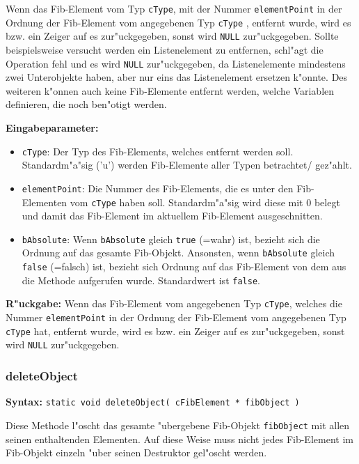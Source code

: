 Wenn das Fib-Element vom Typ \verb|cType|, mit der Nummer \verb|elementPoint| in der Ordnung der Fib-Element vom angegebenen Typ \verb|cType| , entfernt wurde, wird es bzw. ein Zeiger auf es zur"uckgegeben, sonst wird \verb|NULL| zur"uckgegeben. Sollte beispielsweise versucht werden ein Listenelement zu entfernen, schl"agt die Operation fehl und es wird \verb|NULL| zur"uckgegeben, da Listenelemente mindestens zwei Unterobjekte haben, aber nur eins das Listenelement ersetzen k"onnte. Des weiteren k"onnen auch keine Fib-Elemente entfernt werden, welche Variablen definieren, die noch ben"otigt werden.

\bigskip\noindent
\textbf{Eingabeparameter:}
\begin{itemize}
 \item \verb|cType|: Der Typ des Fib-Elements, welches entfernt werden soll. Standardm"a"sig ('u') werden Fib-Elemente aller Typen betrachtet/ gez"ahlt.
 \item \verb|elementPoint|: Die Nummer des Fib-Elements, die es unter den Fib-Elementen vom \verb|cType| haben soll. Standardm"a"sig wird diese mit $0$ belegt und damit das Fib-Element im aktuellem Fib-Element ausgeschnitten.
 \item \verb|bAbsolute|: Wenn \verb|bAbsolute| gleich \verb|true| (=wahr) ist, bezieht sich die Ordnung auf das gesamte Fib-Objekt. Ansonsten, wenn \verb|bAbsolute| gleich \verb|false| (=falsch) ist, bezieht sich Ordnung auf das Fib-Element von dem aus die Methode aufgerufen wurde. Standardwert ist \verb|false|.
\end{itemize}

\bigskip\noindent
\textbf{R"uckgabe:} Wenn das Fib-Element vom angegebenen Typ \verb|cType|, welches die Nummer \verb|elementPoint| in der Ordnung der Fib-Element vom angegebenen Typ \verb|cType| hat, entfernt wurde, wird es bzw. ein Zeiger auf es zur"uckgegeben, sonst wird \verb|NULL| zur"uckgegeben.


\subsubsection{deleteObject}

\textbf{Syntax:} \verb|static void deleteObject( cFibElement * fibObject )|

\bigskip\noindent
Diese Methode l"oscht das gesamte "ubergebene Fib-Objekt \verb|fibObject| mit allen seinen enthaltenden Elementen.
Auf diese Weise muss nicht jedes Fib-Element im Fib-Objekt einzeln "uber seinen Destruktor gel"oscht werden.

